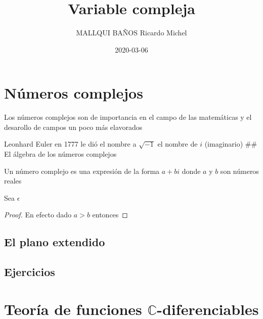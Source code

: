 \documentclass[]{book}
\title{Variable compleja}
\author{MALLQUI BAÑOS Ricardo Michel}
\date{2020-03-06}
\theoremstyle{definition}
\theoremstyle{definition}
\theoremstyle{definition}
\theoremstyle{remark}
\let\BeginKnitrBlock\begin \let\EndKnitrBlock\end
\begin{document}
\maketitle

{
\setcounter{tocdepth}{1}
\tableofcontents
}
\hypertarget{nuxfameros-complejos}{%
\chapter{Números complejos}\label{nuxfameros-complejos}}

Los números complejos son de importancia en el campo de las matemáticas y el desarollo de campos un poco más elavorados

Leonhard Euler en 1777 le dió el nombre a \(\sqrt{-1}\) el nombre de \(i\) (imaginario)
\#\# El álgebra de los números complejos

\BeginKnitrBlock{definition}[Número complejo]
\protect\hypertarget{def:unnamed-chunk-1}{}{\label{def:unnamed-chunk-1} \iffalse (Número complejo) \fi{} }Un número complejo es una expresión de la forma \(a+bi\) donde \(a\) y \(b\) son números reales
\EndKnitrBlock{definition}

\BeginKnitrBlock{theorem}
\protect\hypertarget{thm:unnamed-chunk-2}{}{\label{thm:unnamed-chunk-2} }Sea \(\epsilon\)
\EndKnitrBlock{theorem}

\BeginKnitrBlock{proof}
\iffalse{} {Demostración. } \fi{}En efecto dado \(a>b\) entonces
\EndKnitrBlock{proof}

\hypertarget{el-plano-extendido}{%
\section{El plano extendido}\label{el-plano-extendido}}

\hypertarget{ejercicios}{%
\section{Ejercicios}\label{ejercicios}}

\BeginKnitrBlock{exercise}
\protect\hypertarget{exr:unnamed-chunk-4}{}{\label{exr:unnamed-chunk-4} }
\EndKnitrBlock{exercise}

\BeginKnitrBlock{solution}
\iffalse{} {Solución. } \fi{}
\EndKnitrBlock{solution}

\hypertarget{teoruxeda-de-funciones-mathbbc-diferenciables}{%
\chapter{\texorpdfstring{Teoría de funciones \(\mathbb{C}\)-diferenciables}{Teoría de funciones \textbackslash{}mathbb\{C\}-diferenciables}}\label{teoruxeda-de-funciones-mathbbc-diferenciables}}
\end{document}
